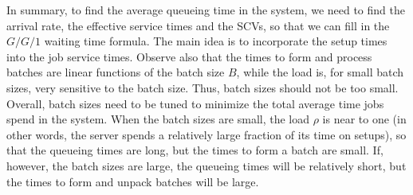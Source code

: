 In summary, to find the average queueing time in the system, we need to find the arrival rate, the effective service times and the SCVs, so that we can fill in the $G/G/1$ waiting time formula.
The main idea is to incorporate the setup times into the job service times.
Observe also that the times to form and process batches are linear functions of the batch size $B$, while the load is, for small batch sizes, very sensitive to the batch size.
Thus, batch sizes should not be too small.
Overall, batch sizes need to be tuned to minimize the total average time jobs spend in the system.
When the batch sizes are small, the load $\rho$ is near to one (in other words, the server spends a relatively large fraction of its time on setups), so that the queueing times are long, but the times to form a batch are small.
If, however, the batch sizes are large, the queueing times will be relatively short, but the times to form and unpack batches will be large.



